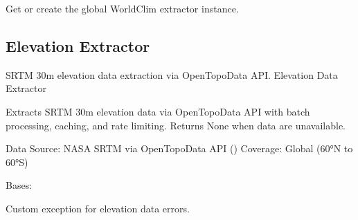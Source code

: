 \documentclass[letterpaper,10pt,english]{sphinxmanual}
\begin{document}
\begin{fulllineitems}
\label{\detokenize{api_reference:app.services.worldclim_extractor.get_worldclim_extractor}}
\pysigstartsignatures
\pysiglinewithargsret
{}
{}
{}
\pysigstopsignatures
\sphinxAtStartPar
Get or create the global WorldClim extractor instance.
\begin{quote}\begin{description}
\sphinxAtStartPar
{}

\end{description}\end{quote}

\end{fulllineitems}



\subsection{Elevation Extractor}
\label{\detokenize{api_reference:elevation-extractor}}
\sphinxAtStartPar
SRTM 30m elevation data extraction via Open\sphinxhyphen{}Topo\sphinxhyphen{}Data API.
\label{\detokenize{api_reference:module-app.services.elevation_extractor}}
\sphinxAtStartPar
Elevation Data Extractor

\sphinxAtStartPar
Extracts SRTM 30m elevation data via Open\sphinxhyphen{}Topo\sphinxhyphen{}Data API with batch processing,
caching, and rate limiting. Returns None when data are unavailable.

\sphinxAtStartPar
Data Source: NASA SRTM via Open\sphinxhyphen{}Topo\sphinxhyphen{}Data API ()
Coverage: Global (60°N to 60°S)

\begin{fulllineitems}
\label{\detokenize{api_reference:app.services.elevation_extractor.ElevationDataError}}
\pysigstartsignatures
\pysigline
{}
\pysigstopsignatures
\sphinxAtStartPar
Bases: 

\sphinxAtStartPar
Custom exception for elevation data errors.

\end{fulllineitems}
\end{document}
